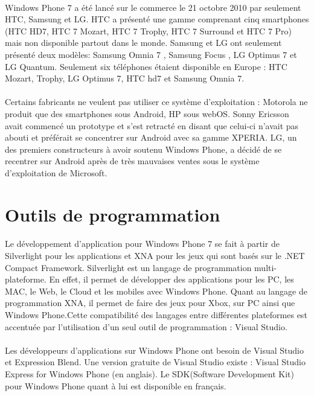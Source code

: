 \documentclass[twoside,UTF8]{EPURapport}
\begin{document}
\paragraph{}
Windows Phone 7 a été lancé sur le commerce le 21 octobre 2010 par seulement HTC, Samsung et LG. HTC a présenté une gamme comprenant cinq smartphones (HTC HD7, HTC 7 Mozart, HTC 7 Trophy, HTC 7 Surround et HTC 7 Pro) mais non disponible partout dans le monde. Samsung et LG ont seulement présenté deux modèles: Samsung Omnia 7 , Samsung Focus , LG Optimus 7 et LG Quantum. Seulement six téléphones étaient disponible en Europe : HTC Mozart, Trophy, LG Optimus 7, HTC hd7 et Samsung Omnia 7.

\paragraph{}
Certains fabricants ne veulent pas utiliser ce système d'exploitation : Motorola ne produit que des smartphones sous Android, HP sous webOS. Sonny Ericsson avait commencé un prototype et s'est retracté en disant que celui-ci n'avait pas abouti et préférait se concentrer sur Android avec sa gamme XPERIA. LG, un des premiers constructeurs à avoir soutenu Windows Phone, a décidé de se recentrer sur Android après de très mauvaises ventes sous le système d'exploitation de Microsoft.

	
\section{Outils de programmation}

\paragraph{}
Le développement d'application pour Windows Phone 7 se fait à partir de Silverlight pour les applications et XNA pour les jeux qui sont basés sur le .NET Compact Framework. Silverlight est un langage de programmation multi-plateforme. En effet, il permet de développer des applications pour les PC, les MAC, le Web, le Cloud et les mobiles avec Windows Phone. Quant au langage de programmation XNA, il permet de faire des jeux pour Xbox, sur PC ainsi que Windows Phone.Cette compatibilité des langages entre différentes plateformes est accentuée par l'utilisation d'un seul outil de programmation : Visual Studio. 

\paragraph{}
Les développeurs d'applications sur Windows Phone ont besoin de Visual Studio et Expression Blend. Une version gratuite de Visual Studio existe : Visual Studio Express for Windows Phone (en anglais). Le SDK(Software Development Kit) pour Windows Phone quant à lui est disponible en français. 
\end{document}
